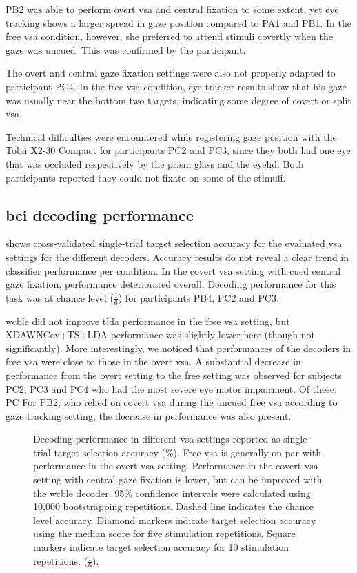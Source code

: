 \documentclass[twocolumn]{article}
\begin{document}
PB2 was able to perform overt \ac{vsa} and central fixation to some extent,
yet eye tracking shows a larger spread in gaze position compared to
PA1 and PB1.
In the free \ac{vsa} condition, however, she preferred to attend
stimuli covertly when the gaze was uncued.
This was confirmed by the participant.

The overt and central gaze fixation settings were also not properly adapted to
participant PC4.
In the free \ac{vsa} condition, eye tracker results show that his gaze was usually near the
bottom two targets, indicating some degree of covert or split \ac{vsa}.

Technical difficulties were encountered while registering gaze position with the Tobii X2-30
Compact for participants PC2 and PC3, since they both had one eye that was
occluded respectively by the prism glass and the eyelid.
Both participants reported they could not fixate on some of the
stimuli.

\subsection{\Acs{bci} decoding performance}

 shows cross-validated single-trial target selection
accuracy for the evaluated \ac{vsa} settings for the different decoders.
Accuracy results do not reveal a clear trend in classifier performance per
condition.
In the covert \ac{vsa} setting with cued central gaze fixation, performance
deteriorated overall.
Decoding performance for this task was at chance level ($\frac{1}{6}$) for
participants PB4, PC2 and PC3.

\Ac{wcble} did not improve \ac{tlda} performance in the free \ac{vsa} setting, but
XDAWNCov+TS+LDA performance was slightly lower here (though not
significantly).
More interestingly, we noticed that performances of the decoders in free
\ac{vsa} were close to those in the overt \ac{vsa}.
A substantial decrease in performance from the overt setting to the free
setting was observed for subjects PC2, PC3 and PC4 who had the most severe eye
motor impairment. Of these, PC
For PB2, who relied on covert \ac{vsa} during the uncued free \ac{vsa}
according to gaze tracking setting, the decrease in performance was also
present.
\begin{figure}[t]
   
  \caption{%
    Decoding performance in different \ac{vsa} settings reported as
    single-trial target selection accuracy (\%).
    Free \ac{vsa} is generally on par with performance in the overt \ac{vsa}
    setting.
    Performance in the covert \ac{vsa} setting with central gaze fixation is lower, but can
    be improved with the \ac{wcble} decoder.
    95\% confidence intervals were calculated using 10,000 bootstrapping
    repetitions. Dashed line indicates the chance level accuracy. Diamond
    markers indicate target selection accuracy using the median score for five stimulation
    repetitions. Square markers indicate target selection accuracy for 10
    stimulation repetitions.
    ($\frac{1}{6}$).
  }
  \label{fig:patients/decode}
\end{figure}
\end{document}
